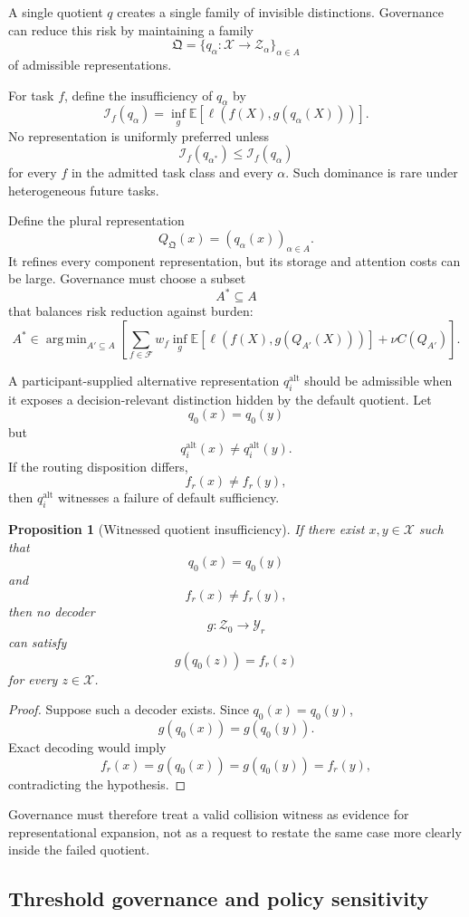 \documentclass[11pt]{article}
\newtheorem{proposition}[definition]{Proposition}
\theoremstyle{definition}
\DeclareMathOperator{\argmin}{arg\,min}
\newcommand{\E}{\mathbb{E}}
\begin{document}
A single quotient \(q\) creates a single family of invisible distinctions. Governance can reduce this risk by maintaining a family
\[
\mathfrak{Q}
=
\{q_{\alpha}:\mathcal{X}\to\mathcal{Z}_{\alpha}\}_{\alpha\in A}
\]
of admissible representations.

For task \(f\), define the insufficiency of \(q_\alpha\) by
\[
\mathcal{I}_f(q_\alpha)
=
\inf_g
\E\!\left[
\ell(
f(X),
g(q_\alpha(X))
)
\right].
\]
No representation is uniformly preferred unless
\[
\mathcal{I}_f(q_{\alpha^{*}})
\leq
\mathcal{I}_f(q_\alpha)
\]
for every \(f\) in the admitted task class and every \(\alpha\). Such dominance is rare under heterogeneous future tasks.

Define the plural representation
\[
Q_{\mathfrak{Q}}(x)
=
\left(
q_\alpha(x)
\right)_{\alpha\in A}.
\]
It refines every component representation, but its storage and attention costs can be large. Governance must choose a subset
\[
A^{*}\subseteq A
\]
that balances risk reduction against burden:
\[
A^{*}
\in
\argmin_{A'\subseteq A}
\left[
\sum_{f\in\mathcal{F}}
w_f
\inf_g
\E[
\ell(f(X),g(Q_{A'}(X)))
]
+
\nu C(Q_{A'})
\right].
\]

A participant-supplied alternative representation \(q_i^{\mathrm{alt}}\) should be admissible when it exposes a decision-relevant distinction hidden by the default quotient. Let
\[
q_0(x)=q_0(y)
\]
but
\[
q_i^{\mathrm{alt}}(x)\neq q_i^{\mathrm{alt}}(y).
\]
If the routing disposition differs,
\[
f_r(x)\neq f_r(y),
\]
then \(q_i^{\mathrm{alt}}\) witnesses a failure of default sufficiency.

\begin{proposition}[Witnessed quotient insufficiency]
If there exist \(x,y\in\mathcal{X}\) such that
\[
q_0(x)=q_0(y)
\]
and
\[
f_r(x)\neq f_r(y),
\]
then no decoder
\[
g:\mathcal{Z}_0\to\mathcal{Y}_r
\]
can satisfy
\[
g(q_0(z))=f_r(z)
\]
for every \(z\in\mathcal{X}\).
\end{proposition}

\begin{proof}
Suppose such a decoder exists. Since \(q_0(x)=q_0(y)\),
\[
g(q_0(x))=g(q_0(y)).
\]
Exact decoding would imply
\[
f_r(x)=g(q_0(x))=g(q_0(y))=f_r(y),
\]
contradicting the hypothesis.
\end{proof}

Governance must therefore treat a valid collision witness as evidence for representational expansion, not as a request to restate the same case more clearly inside the failed quotient.

\subsection{Threshold governance and policy sensitivity}
\end{document}
